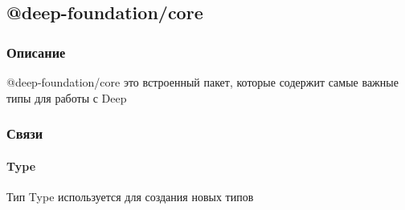 \documentclass{article}
\begin{document}


\subsection{@deep-foundation/core}
\subsubsection{Описание}\hypertarget{Core.Description}{}
@deep-foundation/core это встроенный пакет, которые
содержит самые важные типы для работы с Deep
\subsubsection{Связи}
\paragraph*{Type}\hypertarget{Core.Type.Description}{}
Тип Type используется для создания новых типов
\end{document}
